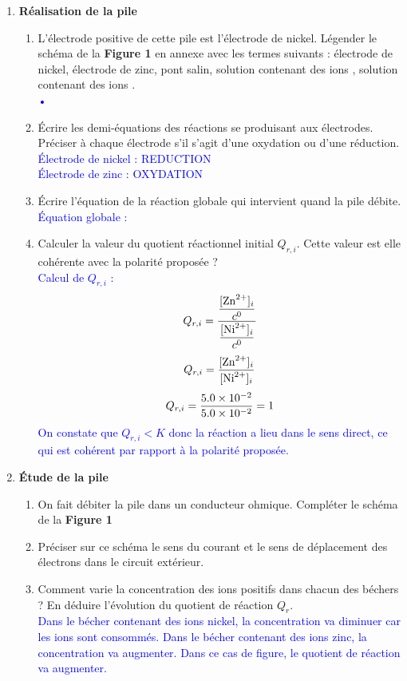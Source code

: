 \documentclass[a4paper,11pt,fleqn]{article}%
\begin{document}
\begin{enumerate}
	\item \textbf{Réalisation de la pile}
	\begin{enumerate}[label=\theenumi.\arabic*]
		\item L'électrode positive de cette pile est l'électrode de nickel. Légender le schéma de la \textbf{Figure 1} en annexe avec les termes suivants : électrode de nickel, électrode de zinc, pont salin, solution contenant des ions , solution contenant des ions .\\
		\textcolor{blue}{•}
		\item Écrire les demi-équations des réactions se produisant aux électrodes. Préciser à chaque électrode s'il s'agit d'une oxydation ou d'une réduction.\\
		\textcolor{blue}{Électrode de nickel :  REDUCTION\\
		Électrode de zinc :  OXYDATION}
		\item Écrire l'équation de la réaction globale qui intervient quand la pile débite.\\
		\textcolor{blue}{Équation globale : }
		\item Calculer la valeur du quotient réactionnel initial $Q_{r,i}$. Cette valeur est elle cohérente avec la polarité proposée ?\\
		\textcolor{blue}{Calcul de $Q_{r,i}$ :
		$$Q_{r,i} = \dfrac{\dfrac{[\ce{Zn^2+}]_i}{c^0}}{\dfrac{[\ce{Ni^2+}]_i}{c^0}}$$
		$$ Q_{r,i} = \dfrac{[\ce{Zn^2+}]_i}{[\ce{Ni^2+}]_i}$$
		$$ Q_{r,i} = \dfrac{\num{5,0E-2}}{\num{5,0E-2}} = 1$$
		On constate que $Q_{r,i}<K$ donc la réaction a lieu dans le sens direct, ce qui est cohérent par rapport à la polarité proposée.}
	\end{enumerate}
	\item \textbf{Étude de la pile}
	\begin{enumerate}[label=\theenumi.\arabic*]
		\item On fait débiter la pile dans un conducteur ohmique. Compléter le schéma de la \textbf{Figure 1}
		\item Préciser sur ce schéma le sens du courant et le sens de déplacement des électrons dans le circuit extérieur.
		\item Comment varie la concentration des ions positifs dans chacun des béchers ? En déduire l'évolution du quotient de réaction $Q_r$.\\
		\textcolor{blue}{Dans le bécher contenant des ions nickel, la concentration va diminuer car les ions sont consommés. Dans le bécher contenant des ions zinc, la concentration va augmenter. Dans ce cas de figure, le quotient de réaction va augmenter.}

\end{enumerate}
\end{enumerate}
\end{document}
